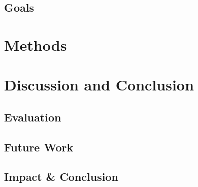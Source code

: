 \documentclass{article}
\begin{document}
\subsection{Goals}

\section{Methods}

\section{Discussion and Conclusion}
\subsection{Evaluation}
\subsection{Future Work}
\subsection{Impact \& Conclusion}
\end{document}
